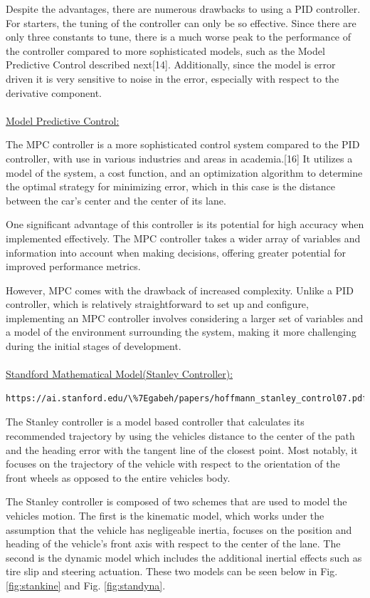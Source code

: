 \documentclass[titlepage]{article}
\begin{document}
{Despite the advantages, there are numerous drawbacks to using a PID controller. For starters, the tuning of the controller can only be so effective. Since there are only three constants to tune, there is a much worse peak to the performance of the controller compared to more sophisticated models, such as the Model Predictive Control described next[14]. Additionally, since the model is error driven it is very sensitive to noise in the error, especially with respect to the derivative component.\\~\\
\underline{Model Predictive Control:}

The MPC controller is a more sophisticated control system compared to the PID controller, with use in various industries and areas in academia.[16] It utilizes a model of the system, a cost function, and an optimization algorithm to determine the optimal strategy for minimizing error, which in this case is the distance between the car’s center and the center of its lane.

One significant advantage of this controller is its potential for high accuracy when implemented effectively. The MPC controller takes a wider array of variables and information into account when making decisions, offering greater potential for improved performance metrics.

However, MPC comes with the drawback of increased complexity. Unlike a PID controller, which is relatively straightforward to set up and configure, implementing an MPC controller involves considering a larger set of variables and a model of the environment surrounding the system, making it more challenging during the initial stages of development. \\~\\
\underline{Standford Mathematical Model(Stanley Controller):}

\begin{verbatim}
https://ai.stanford.edu/\%7Egabeh/papers/hoffmann_stanley_control07.pdf
\end{verbatim}

The Stanley controller is a model based controller that calculates its recommended trajectory by using the vehicles distance to the center of the path and the heading error with the tangent line of the closest point. Most notably, it focuses on the trajectory of the vehicle with respect to the orientation of the front wheels as opposed to the entire vehicles body.

The Stanley controller is composed of two schemes that are used to model the vehicles motion. The first is the kinematic model, which works under the assumption that the vehicle has negligeable inertia, focuses on the position and heading of the vehicle's front axis with respect to the center of the lane. The second is the dynamic model which includes the additional inertial effects such as tire slip and steering actuation. These two models can be seen below in Fig. \ref{fig:stankine} and Fig. \ref{fig:standyna}.

}
\end{document}
